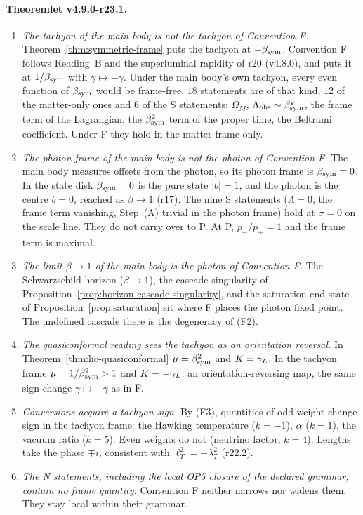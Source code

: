 \paragraph{Theoremlet v4.9.0-r23.1.}
\begin{enumerate}[leftmargin=2em]
\item[(a)] \emph{The tachyon of the main body is not the tachyon of Convention F.}  Theorem~\ref{thm:symmetric-frame} puts the tachyon at
\(-\beta_{\mathrm{sym}}\).  Convention F follows Reading~B and the superluminal rapidity of r20 (v4.8.0), and puts it at \(1/\beta_{\mathrm{sym}}\) with
\(\gamma\mapsto-\gamma\).  Under the main body's own tachyon, every even function of \(\beta_{\mathrm{sym}}\) would be frame-free.  \(18\) statements are of that
kind, \(12\) of the matter-only ones and \(6\) of the S statements: \(\Omega_M\), \(\Lambda_{\rm obs}\sim\beta_{\mathrm{sym}}^2\), the frame term of the Lagrangian, the
\(\beta_{\mathrm{sym}}^2\) term of the proper time, the Beltrami coefficient.  Under F they hold in the matter frame only.
\item[(b)] \emph{The photon frame of the main body is not the photon of Convention F.}  The main body measures offsets from the photon,
so its photon frame is \(\beta_{\mathrm{sym}}=0\).  In the state disk \(\beta_{\mathrm{sym}}=0\) is the pure state \(|b|=1\), and the photon is the centre \(b=0\),
reached as \(\beta\to1\) (r17).  The nine S statements (\(\Lambda=0\), the frame term vanishing, Step~(A) trivial in the photon
frame) hold at \(\sigma=0\) on the scale line.  They do not carry over to P.  At P, \(p_-/p_+=1\) and the frame term is maximal.
\item[(c)] \emph{The limit \(\beta\to1\) of the main body is the photon of Convention F.}  The Schwarzschild horizon (\(\beta\to1\)), the cascade
singularity of Proposition~\ref{prop:horizon-cascade-singularity}, and the saturation end state of Proposition~\ref{prop:saturation}
sit where F places the photon fixed point.  The undefined cascade there is the degeneracy of (F2).
\item[(d)] \emph{The quasiconformal reading sees the tachyon as an orientation reversal.}  In Theorem~\ref{thm:hc-quasiconformal}
\(\mu=\beta_{\mathrm{sym}}^2\) and \(K=\gamma_L\).  In the tachyon frame \(\mu=1/\beta_{\mathrm{sym}}^2>1\) and \(K=-\gamma_L\): an orientation-reversing map, the same sign
change \(\gamma\mapsto-\gamma\) as in F.
\item[(e)] \emph{Conversions acquire a tachyon sign.}  By (F3), quantities of odd weight change sign in the tachyon frame: the Hawking
temperature (\(k=-1\)), \(\alpha\) (\(k=1\)), the vacuum ratio (\(k=5\)).  Even weights do not (neutrino factor, \(k=4\)).  Lengths take
the phase \(\mp i\), consistent with \(\ell_T^2=-\lambda_T^2\) (r22.2).
\item[(f)] \emph{The N statements, including the local OP5 closure of the declared grammar, contain no frame quantity.}  Convention F neither
narrows nor widens them.  They stay local within their grammar.
\end{enumerate}

